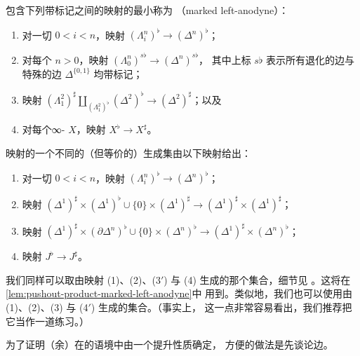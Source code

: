 \begin{definition}\label{def:marked-left-anodyne}
包含下列带标记\trSimplicialSet{}之间的映射的最小\trSaturatedSet{}称为%
\emph{\trMarkedLeftAnodyne}（marked left-anodyne）：
\begin{enumerate}[label=(\arabic*)]
  \item 对一切 $0 < i < n$，映射 $(\Lambda^n_i)^\flat \to (\Delta^n)^\flat$；
  \item 对每个 $n > 0$，映射 $(\Lambda^n_0)^{s\flat} \to (\Delta^n)^{s\flat}$，
        其中上标 $s\flat$ 表示所有退化的边与特殊的边 $\Delta^{\{0,1\}}$ 均带标记；
  \item 映射 $(\Lambda^2_1)^\sharp \amalg_{(\Lambda^2_1)^\flat} (\Delta^2)^\flat \to (\Delta^2)^\sharp$；以及
  \item 对每个∞-\trGroupoid{} $X$，映射 $X^\flat \to X^\sharp$。
\end{enumerate}
\end{definition}

\begin{remark}\label{rem:marked-left-anodyne-generators}
\trMarkedLeftAnodyne{}映射的一个不同的（但等价的）生成集由以下映射给出：
\begin{enumerate}[label={(\arabic*)$'$}]
  \item 对一切 $0 < i < n$，映射 $(\Lambda^n_i)^\flat \to (\Delta^n)^\flat$；
  \item 映射 $(\Delta^1)^\sharp \times (\Delta^1)^\flat \cup \{0\} \times (\Delta^1)^\sharp \to (\Delta^1)^\sharp \times (\Delta^1)^\sharp$；
  \item 映射 $(\Delta^1)^\sharp \times (\partial\Delta^n)^\flat \cup \{0\} \times (\Delta^n)^\flat \to (\Delta^1)^\sharp \times (\Delta^n)^\flat$；
  \item 映射 $J^\flat \to J^\sharp$。
\end{enumerate}
\end{remark}

\begin{remark}\label{rem:marked-left-anodyne-equivalent-generators}
我们同样可以取由映射 (1)、(2)、(3$'$) 与 (4) 生成的那个集合，细节见
\cite[Proposition 3.1.1.5]{Lur09}。这将在\cref{lem:pushout-product-marked-left-anodyne}中
用到。类似地，我们也可以使用由 (1)、(2)、(3) 与 (4$'$) 生成的集合。（事实上，
这一点非常容易看出，我们推荐把它当作一道练习。）
\end{remark}

为了证明（余）\trCartesianFibration{}在\trMarkedSimplicialSet{}的语境中由一个提升性质确定，
方便的做法是先谈论\trLocallyCocartesian{}边。

